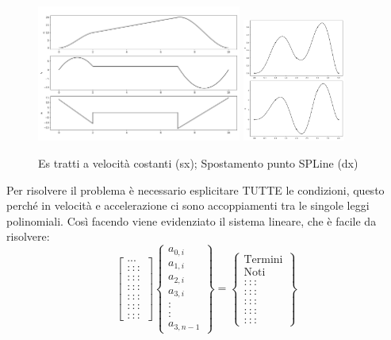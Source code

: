 \begin{figure}[h]
    \centering
    \includegraphics[width=0.6\textwidth]{Immagini/tratti_vel_cost.png}
    \includegraphics[width=0.3\textwidth]{Immagini/SPLine_spostamento_punto.png}
    \caption{Es tratti a velocità costanti (sx); Spostamento punto SPLine (dx)}
\end{figure}

Per risolvere il problema è necessario esplicitare TUTTE le condizioni, questo perché in velocità e accelerazione ci sono accoppiamenti tra le singole leggi polinomiali.
Così facendo viene evidenziato il sistema lineare, che è facile da risolvere:
\[ 
\begin{bmatrix}
... \\ ::: \\ ::: \\ ::: \\ ::: \\ ::: \\ :::
\end{bmatrix} 
\begin{Bmatrix}
    a_{0,i} \\ a_{1,i} \\ a_{2,i} \\ a_{3,i} \\ : \\ : \\ a_{3,n-1}
\end{Bmatrix} =
\begin{Bmatrix}
    \text{Termini} \\ \text{Noti} \\ ::: \\ ::: \\ ::: \\ ::: \\ :::
\end{Bmatrix}
\]

